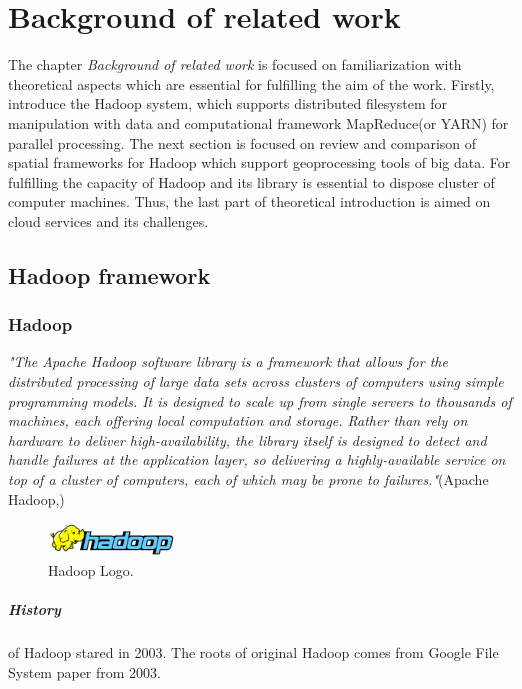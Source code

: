 \documentclass[a4paper,12pt,oneside]{report}
\begin{document}
	
	
	
	
	
	
	\newpage
	\chapter*{Background of related
		work}
	The chapter \textit{Background of related work} is focused on familiarization
	with theoretical aspects which are essential for fulfilling the aim of the work.
	Firstly, introduce the Hadoop system, which supports distributed filesystem for
	manipulation with data and computational framework MapReduce(or YARN) for
	parallel processing. 
	The next section is focused on review and comparison of spatial frameworks for
	Hadoop which support geoprocessing tools of big data. For fulfilling the
	capacity of Hadoop and its library is essential to dispose cluster of computer
	machines. Thus, the last  part of theoretical introduction is aimed on cloud
	services and its challenges.
	\section{Hadoop framework}
	\label{sec:hadoop}
	\subsection*{Hadoop}
	\emph{"The Apache Hadoop software library is a framework that allows for the
		distributed
		processing of large data sets across clusters of computers using simple
		programming 
		models. It is designed to scale up from single servers to 
		thousands of machines, each offering local computation and storage. Rather
		than rely 
		on hardware to deliver high-availability, the library itself is
		designed to detect and handle failures at the application layer, so
		delivering a 
		highly-available service on top of a cluster of computers,
		each of which may be prone to failures."}(Apache Hadoop,\cite{hadoop_web})
	\begin{figure}[!htbp]
		\centering
		\includegraphics[width=0.3\textwidth]{./img/664px-Hadoop_logo.png}
		\caption[Hadoop architecture2]{\centering Hadoop Logo.}
	\end{figure}
	
	\paragraph*{History} of Hadoop stared in 2003. The roots of original Hadoop
	comes from Google File System paper from 2003. 
	
\end{document}
